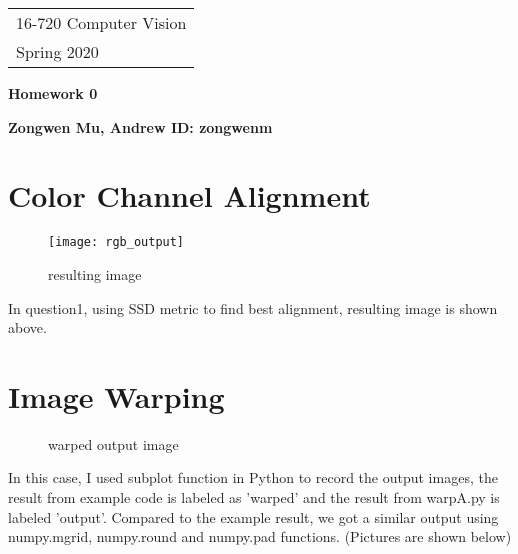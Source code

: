 \documentclass[11pt]{article} \usepackage{fullpage} \usepackage{graphicx} \usepackage{epstopdf} \usepackage{color} \usepackage{psfrag} \usepackage{pdfsync}\usepackage{float}\usepackage{subfigure}\usepackage{indentfirst}
\begin{document}
{\parindent 0pt \begin{tabular}[t]{l} 16-720 Computer Vision \\ Spring 2020 \end{tabular}}%
\parindent 0pt \parskip 8pt
\begin{center} \large\bf Homework 0 \end{center}
\begin{center} \large\bf Zongwen Mu, Andrew ID: zongwenm \end{center}
\bigskip


\section{Color Channel Alignment}

\begin{figure}[ht]
\centering
\texttt{[image: rgb\_output]}
\caption{resulting image}
\end{figure}

\setlength{\parindent}{2em} In question1, using SSD metric to find best alignment, resulting image is shown above.

\section{Image Warping}

\begin{figure}[ht]
\centering
{}
\caption{warped output image}
\end{figure}

In this case, I used subplot function in Python to record the output images, the result from example code is labeled as 'warped' and the result from warpA.py is labeled 'output'. Compared to the example result, we got a similar output using numpy.mgrid, numpy.round and numpy.pad functions. (Pictures are shown below)
\end{document}
